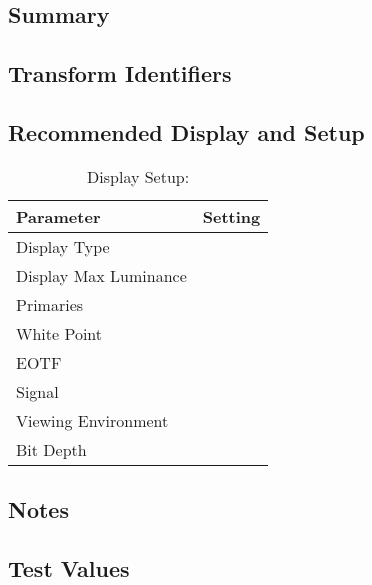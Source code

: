 \section[Rec2020 100nit]{\shortName{}}
\label{sec:odt-details-\id}

\subsection{Summary}
\label{subsec:summary-\id}

\lipsum[1-2] %

\subsection{Transform Identifiers} 
\label{subsec:odt-ident-\id}

\subsection{Recommended Display and Setup}
\label{subsec:setup-\id}

\begin{table}[ht!]  %
    \centering
        \begin{tabular}{|p{1.5in}|p{3in}|}
            \hline
            \textbf{Parameter} 		& 	\textbf{Setting} 				 		\\ \hline
            Display Type 			&									 		\\ \hline
            Display Max Luminance 	& 											\\ \hline
            Primaries	 			& 											\\ \hline
            White Point	 			& 											\\ \hline
            EOTF					& 			 								\\ \hline
            Signal 					&											\\ \hline
            Viewing Environment 	& 											\\ \hline
            Bit Depth 				& 		 									\\ \hline 
    \end{tabular}
    \caption{Display Setup: \shortName{}} 
    \label{tab:setup-\id}
\end{table}

\subsection{Notes}
\label{subsec:notes-\id}

\lipsum[1-2] %


\subsection{Test Values}
\label{subsec:testValues-\id}

\testValuesSubSec{}

